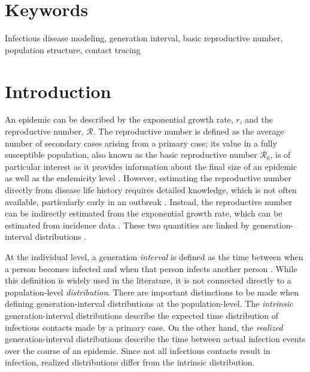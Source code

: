 \documentclass[12pt]{article}
\newcommand{\Rx}[1]{\ensuremath{{\mathcal R}_{#1}}\xspace}
\newcommand{\Ro}{\Rx{0}}
\newcommand{\RR}{\ensuremath{{\mathcal R}}}
\begin{document}
\section*{Keywords}

Infectious disease modeling, generation interval, basic reproductive number, population structure, contact tracing

\pagebreak

\section{Introduction}

An epidemic can be described by the exponential growth rate, $r$, and the reproductive number, \RR.
The reproductive number is defined as the average number of secondary cases arising from a primary case;
its value in a fully susceptible population, also known as the basic reproductive number \Ro, is of particular interest as it provides information about the final size of an epidemic \citep{anderson1991infectious, diekmann1990definition} as well as the endemicity level \citep{kribs2000simple, van2002reproduction, smith2012ross}.
However, estimating the reproductive number directly from disease life history requires detailed knowledge, which is not often available, particularly early in an outbreak \citep{dietz1993estimation}.
Instead, the reproductive number can be indirectly estimated from the exponential growth rate, which can be estimated from incidence data \citep{chowell2003sars, mills2004transmissibility, nishiura2009transmission, nishiura2010pros, ma2014estimating}.
These two quantities are linked by generation-interval distributions \citep{wearing2005appropriate, svensson2007note, roberts2007model, wallinga2007generation, park2019practical}.

At the individual level, a generation \emph{interval} is defined as the time between when a person becomes infected and when that person infects another person \citep{svensson2007note}.
While this definition is widely used in the literature, it is not connected directly to a population-level \emph{distribution}.
There are important distinctions to be made when defining generation-interval distributions at the population-level. The \emph{intrinsic} generation-interval distributions describe the expected time distribution of infectious contacts made by a primary case.
On the other hand, the \emph{realized} generation-interval distributions describe the time between actual infection events over the course of an epidemic.
Since not all infectious contacts result in infection, realized distributions differ from the intrinsic distribution.
\end{document}
